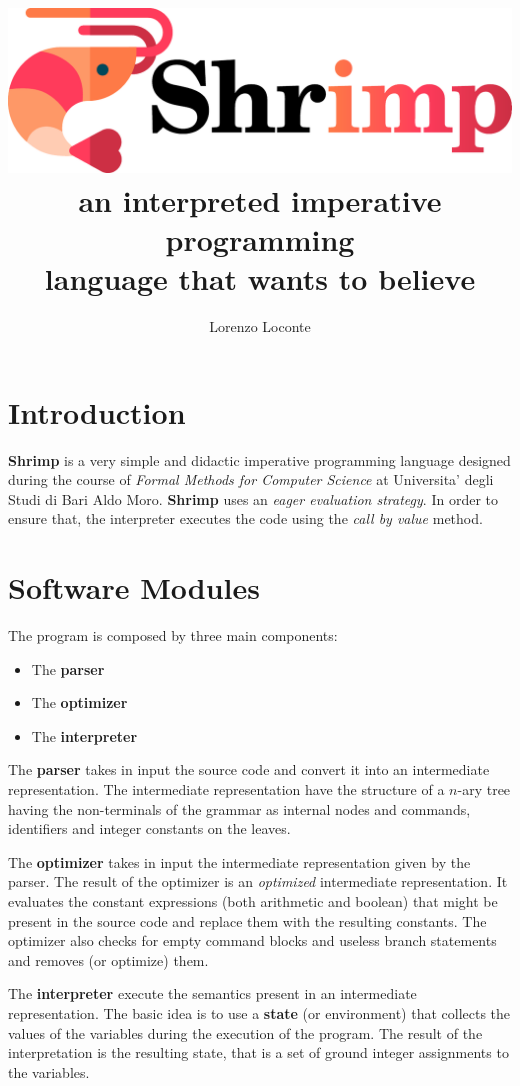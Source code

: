 \documentclass[12pt,a4paper]{article}
\date{}
\title{
    \includegraphics[width=0.67\linewidth]{logo.pdf} \\
    an interpreted imperative programming \\ language that wants to believe
}
\author{Lorenzo Loconte}
\begin{document}
\maketitle

\section*{Introduction}
\textbf{Shrimp} is a very simple and didactic imperative programming language designed during the course of \textit{Formal Methods for Computer Science} at Universita' degli Studi di Bari Aldo Moro.
\textbf{Shrimp} uses an \textit{eager evaluation strategy}.
In order to ensure that, the interpreter executes the code using the \textit{call by value} method.

\section*{Software Modules}
The program is composed by three main components:
\begin{itemize}
    \item The \textbf{parser}
    \item The \textbf{optimizer}
    \item The \textbf{interpreter}
\end{itemize}

The \textbf{parser} takes in input the source code and convert it into an intermediate representation.
The intermediate representation have the structure of a $n$-ary tree having the non-terminals of the grammar as internal nodes and commands, identifiers and integer constants on the leaves.

The \textbf{optimizer} takes in input the intermediate representation given by the parser.
The result of the optimizer is an \textit{optimized} intermediate representation.
It evaluates the constant expressions (both arithmetic and boolean) that might be present in the source code and replace them with the resulting constants.
The optimizer also checks for empty command blocks and useless branch statements and removes (or optimize) them.

The \textbf{interpreter} execute the semantics present in an intermediate representation.
The basic idea is to use a \textbf{state} (or environment) that collects the values of the variables during the execution of the program.
The result of the interpretation is the resulting state, that is a set of ground integer assignments to the variables.
\end{document}
